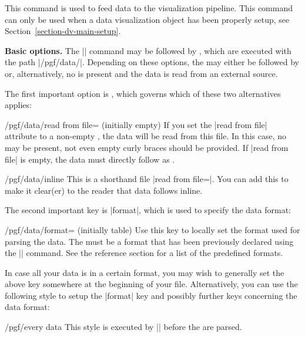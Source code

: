 \begin{command}{\pgfdata{}}
    This command is used to feed data to the visualization pipeline. This
    command can only be used when a data visualization object has been properly
    setup, see Section~\ref{section-dv-main-setup}.


    \medskip
    \textbf{Basic options.}
    The |\pgfdata| command may be followed by , which are
    executed with the path |/pgf/data/|. Depending on these options, the
     may either be followed by  or,
    alternatively, no  is present and the data is read from
    an external source.

    The first important option is , which governs which of these
    two alternatives applies:
    \begin{key}{/pgf/data/read from file= (initially \normalfont empty)}
        If you set the |read from file| attribute to a non-empty
        , the data will be read from this file. In this case, no
         may be present, not even empty curly braces should
        be provided. If |read from file| is empty, the  data must directly
        follow as .
\begin{codeexample}
\pgfdata[format=table, read from file=file1.csv]
\pgfdata[format=table, read from file=file2.csv]
\end{codeexample}
\begin{codeexample}
\end{codeexample}
    \end{key}
    \begin{key}{/pgf/data/inline}
        This is a shorthand file |read from file={}|. You can add this to make
        it clear(er) to the reader that data follows inline.
    \end{key}
    The second important key is |format|, which is used to specify the data
    format:
    \begin{key}{/pgf/data/format= (initially table)}
        Use this key to locally set the format used for parsing the data. The
         must be a format that has been previously declared using
        the |\pgfdeclaredataformat| command. See the reference section for a
        list of the predefined formats.
    \end{key}
    In case all your data is in a certain format, you may wish to generally set
    the above key somewhere at the beginning of your file. Alternatively, you
    can use the following style to setup the |format| key and possibly further
    keys concerning the data format:
    \begin{stylekey}{/pgf/every data}
        This style is executed by |\pgfdata| before the  are
        parsed.


\end{stylekey}
\end{command}
